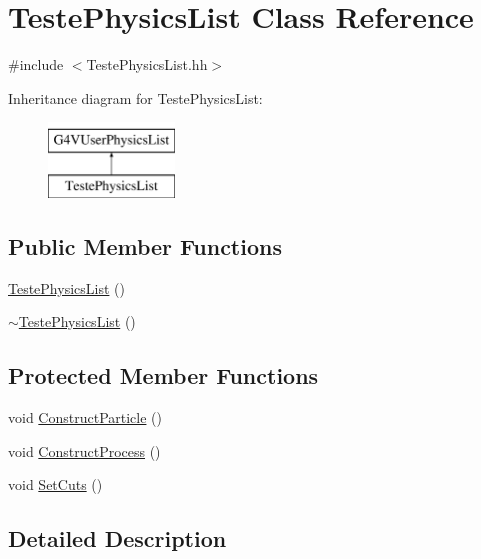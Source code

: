 \hypertarget{class_teste_physics_list}{\section{Teste\-Physics\-List Class Reference}
\label{class_teste_physics_list}
}


{\ttfamily \#include $<$Teste\-Physics\-List.\-hh$>$}

Inheritance diagram for Teste\-Physics\-List\-:\begin{figure}[H]
\begin{center}
\leavevmode
\includegraphics[height=2.000000cm]{class_teste_physics_list}
\end{center}
\end{figure}
\subsection*{Public Member Functions}
\begin{DoxyCompactItemize}
\item 
\hyperlink{class_teste_physics_list_a80905ad5c634c9672b6bec654f572562}{Teste\-Physics\-List} ()
\item 
\hyperlink{class_teste_physics_list_a47937c7e6c6a8d259e23735ca6e148ad}{$\sim$\-Teste\-Physics\-List} ()
\end{DoxyCompactItemize}
\subsection*{Protected Member Functions}
\begin{DoxyCompactItemize}
\item 
void \hyperlink{class_teste_physics_list_a529073a7fd79b97abff758b3f600a0dd}{Construct\-Particle} ()
\item 
void \hyperlink{class_teste_physics_list_a43e995eecc08bf708ed6f699fb095eb8}{Construct\-Process} ()
\item 
void \hyperlink{class_teste_physics_list_a79bcd77a2c7cd8e7469636107657c666}{Set\-Cuts} ()
\end{DoxyCompactItemize}


\subsection{Detailed Description}


